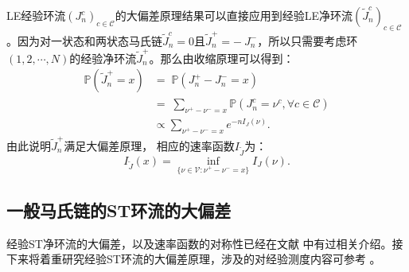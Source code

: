 LE经验环流$(J^{c}_n)_{c\in\mathcal{C}}$的大偏差原理结果可以直接应用到经验LE净环流$(\tilde{J}^{c}_n)_{c\in\mathcal{C}}$。因为对一状态和两状态马氏链$\tilde{J}^c_n = 0$且$\tilde{J}^+_n = -\ {J}^-_n$，所以只需要考虑环$(1, 2, \cdots ,N)$的经验净环流$\tilde{J}^+_n$。那么由收缩原理可以得到：
\begin{equation}\label{tilde I J}
	\begin{split}
		\mathbb{P}\left(\tilde{J}^{+}_n = x\right)
		&=\;\mathbb{P}\left(J^{+}_n-J^{-}_n = x\right)\\
		&=\;\sum_{\nu^{+}-\nu^{-}=x}\mathbb{P}\left(J^{c}_n=\nu^{c},\forall c\in\mathcal{C}\right)\\
		&\propto\sum_{\nu^{+}-\nu^{-}=x} e^{-nI_J(\nu)}.
	\end{split}
\end{equation}
由此说明$\tilde{J}^+_n$满足大偏差原理， 相应的速率函数$I_{\tilde{J}}$为：
\begin{equation*}
	I_{\tilde{J}}(x)=\inf_{\{\nu\in\mathcal{V}:\nu^{+}-\nu^{-}= x\}}I_J(\nu).
\end{equation*} 



\subsection{一般马氏链的ST环流的大偏差}

经验ST净环流的大偏差，以及速率函数的对称性已经在文献 \cite{bertini2015flows} 中有过相关介绍。接下来将着重研究经验ST环流的大偏差原理，涉及的对经验测度内容可参考 \cite{den2000large}。

